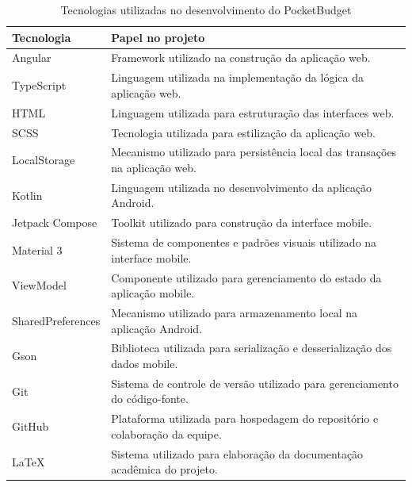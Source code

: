 \documentclass[12pt,a4paper]{article}
\begin{document}
\begin{table}[H]
    \centering
    \caption{Tecnologias utilizadas no desenvolvimento do PocketBudget}
    \label{tab:tecnologias}
    \begin{tabular}{p{3.2cm}p{8.6cm}}
        \toprule
        \textbf{Tecnologia} & \textbf{Papel no projeto} \\
        \midrule
        Angular & Framework utilizado na construção da aplicação web. \\
        
        TypeScript & Linguagem utilizada na implementação da lógica da aplicação web. \\
        
        HTML & Linguagem utilizada para estruturação das interfaces web. \\
        
        SCSS & Tecnologia utilizada para estilização da aplicação web. \\
        
        LocalStorage & Mecanismo utilizado para persistência local das transações na aplicação web. \\
        
        Kotlin & Linguagem utilizada no desenvolvimento da aplicação Android. \\
        
        Jetpack Compose & Toolkit utilizado para construção da interface mobile. \\
        
        Material 3 & Sistema de componentes e padrões visuais utilizado na interface mobile. \\
        
        ViewModel & Componente utilizado para gerenciamento do estado da aplicação mobile. \\
        
        SharedPreferences & Mecanismo utilizado para armazenamento local na aplicação Android. \\
        
        Gson & Biblioteca utilizada para serialização e desserialização dos dados mobile. \\
        
        Git & Sistema de controle de versão utilizado para gerenciamento do código-fonte. \\
        
        GitHub & Plataforma utilizada para hospedagem do repositório e colaboração da equipe. \\
        
        LaTeX & Sistema utilizado para elaboração da documentação acadêmica do projeto. \\
        \bottomrule
    \end{tabular}
\end{table}
\end{document}
